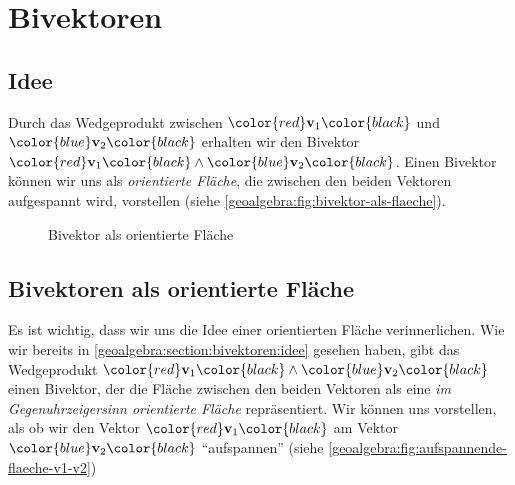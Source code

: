 
\section{Bivektoren
\label{geoalgebra:section:bivektoren}}
\subsection{Idee}
\label{geoalgebra:section:bivektoren:idee}
\newcommand{\vone}{\color{red}\mathbf{v}_1\color{black}}
\newcommand{\vtwo}{\color{blue}\mathbf{v}_2\color{black}}
Durch das Wedgeprodukt zwischen $\vone$ und $\vtwo$ erhalten wir
den
Bivektor $\vone \wedge \vtwo$. Einen Bivektor können wir uns als \emph{orientierte Fläche}, die zwischen den beiden Vektoren aufgespannt
wird, vorstellen (siehe \autoref{geoalgebra:fig:bivektor-als-flaeche}).
\begin{figure}
  \begin{center}
  \end{center}
  \caption{Bivektor als orientierte Fläche}\label{geoalgebra:fig:bivektor-als-flaeche}
\end{figure}

\subsection{Bivektoren als orientierte Fläche}
Es ist wichtig, dass wir uns die Idee einer orientierten Fläche
verinnerlichen. Wie wir bereits in \autoref{geoalgebra:section:bivektoren:idee} gesehen haben,
gibt das Wedgeprodukt $\vone \wedge \vtwo$
einen Bivektor, der die Fläche zwischen den beiden Vektoren als
eine \emph{im Gegenuhrzeigersinn orientierte Fläche} repräsentiert.
Wir können uns vorstellen, als ob wir den Vektor $\vone$
am Vektor $\vtwo$ ``aufspannen'' (siehe \autoref{geoalgebra:fig:aufspannende-flaeche-v1-v2})

